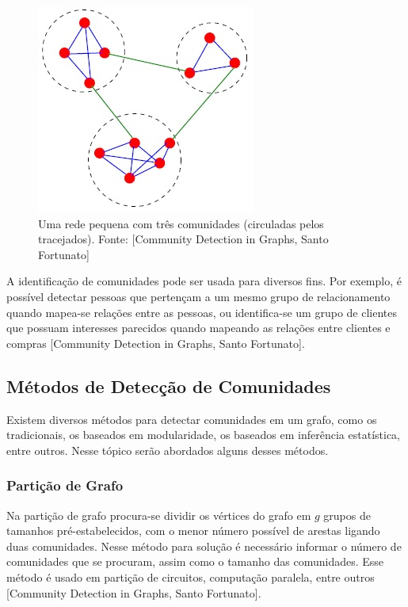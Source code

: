 \documentclass[xindy,rascunho]{fei}
\begin{document}
\begin{figure}
\centering
\includegraphics[width=0.7\linewidth]{./Imagens_Monografia/Community_Detection_in_Graphs_-_Santo_Fortunato(Representacao_Comunidades).jpg}
\caption{Uma rede pequena com três comunidades (circuladas pelos tracejados). 
Fonte: [Community Detection in Graphs, Santo Fortunato]}
\label{fig:Comunidade}
\end{figure}

A identificação de comunidades pode ser usada para diversos fins. Por exemplo, é possível detectar pessoas que pertençam a um mesmo grupo de relacionamento quando mapea-se relações entre as pessoas, ou identifica-se um grupo de clientes que possuam interesses parecidos quando mapeando as relações entre clientes e compras [Community Detection in Graphs, Santo Fortunato].

\subsection{Métodos de Detecção de Comunidades}
Existem diversos métodos para detectar comunidades em um grafo, como os tradicionais, os baseados em modularidade, os baseados em inferência estatística, entre outros. Nesse tópico serão abordados alguns desses métodos.

\subsubsection{Partição de Grafo}
Na partição de grafo procura-se dividir os vértices do grafo em $g$ grupos de tamanhos pré-estabelecidos, com o menor número possível de arestas ligando duas comunidades. Nesse método para solução é necessário informar o número de comunidades que se procuram, assim como o tamanho das comunidades. Esse método é usado em partição de circuitos, computação paralela, entre outros [Community Detection in Graphs, Santo Fortunato].
\end{document}
